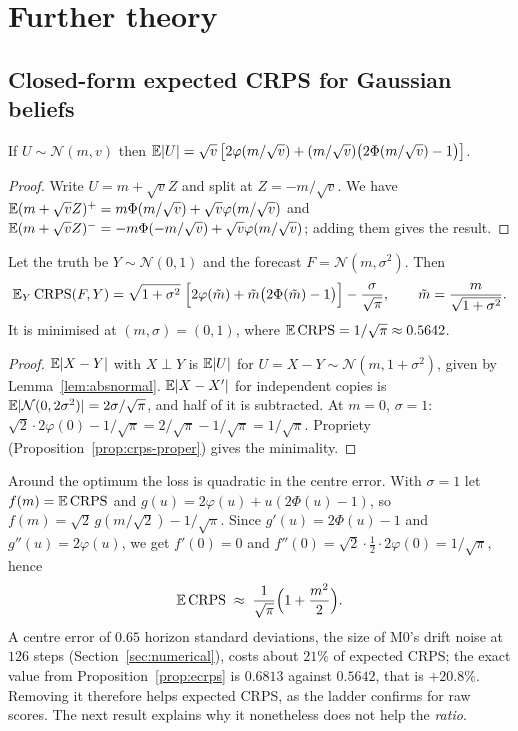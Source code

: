 \section{Further theory}\label{app:theory}

\subsection{Closed-form expected CRPS for Gaussian beliefs}

\begin{lemma}\label{lem:absnormal}
If $U\sim\mathcal N(m,v)$ then $\mathbb{E}|U|=\sqrt v\,\bigl[2\varphi(m/\sqrt v)+(m/\sqrt v)\bigl(2\Phi(m/\sqrt v)-1\bigr)\bigr]$.
\end{lemma}
\begin{proof}
Write $U=m+\sqrt vZ$ and split at $Z=-m/\sqrt v$. We have $\mathbb{E}(m+\sqrt vZ)^+=m\Phi(m/\sqrt v)+\sqrt v\varphi(m/\sqrt v)$ and
$\mathbb{E}(m+\sqrt vZ)^-=-m\Phi(-m/\sqrt v)+\sqrt v\varphi(m/\sqrt v)$; adding them gives the result.
\end{proof}

\begin{proposition}\label{prop:ecrps}
Let the truth be $Y\sim\mathcal N(0,1)$ and the forecast $F=\mathcal N(m,\sigma^2)$. Then
\begin{equation}
  \mathbb{E}_Y\operatorname{CRPS}(F,Y)=\sqrt{1+\sigma^2}\;\Bigl[2\varphi(\tilde m)+\tilde m\bigl(2\Phi(\tilde m)-1\bigr)\Bigr]-\frac{\sigma}{\sqrt\pi},
  \qquad \tilde m=\frac{m}{\sqrt{1+\sigma^2}} .
\end{equation}
It is minimised at $(m,\sigma)=(0,1)$, where $\mathbb{E}\operatorname{CRPS}=1/\sqrt\pi\approx0.5642$.
\end{proposition}
\begin{proof}
$\mathbb{E}|X-Y|$ with $X\perp Y$ is $\mathbb{E}|U|$ for $U=X-Y\sim\mathcal N(m,1+\sigma^2)$, given by Lemma~\ref{lem:absnormal}. $\mathbb{E}|X-X'|$ for independent copies is
$\mathbb{E}|\mathcal N(0,2\sigma^2)|=2\sigma/\sqrt\pi$, and half of it is subtracted. At $m=0$, $\sigma=1$: $\sqrt2\cdot2\varphi(0)-1/\sqrt\pi=2/\sqrt\pi-1/\sqrt\pi=1/\sqrt\pi$.
Propriety (Proposition~\ref{prop:crps-proper}) gives the minimality.
\end{proof}
Around the optimum the loss is quadratic in the centre error. With $\sigma=1$ let $f(m)=\mathbb{E}\operatorname{CRPS}$ and $g(u)=2\varphi(u)+u(2\Phi(u)-1)$, so
$f(m)=\sqrt2\,g(m/\sqrt2)-1/\sqrt\pi$. Since $g'(u)=2\Phi(u)-1$ and $g''(u)=2\varphi(u)$, we get $f'(0)=0$ and $f''(0)=\sqrt2\cdot\frac12\cdot2\varphi(0)=1/\sqrt\pi$, hence
\begin{equation}
  \mathbb{E}\operatorname{CRPS}\;\approx\;\frac{1}{\sqrt\pi}\Bigl(1+\frac{m^2}{2}\Bigr).
\end{equation}
A centre error of $0.65$ horizon standard deviations, the size of M0's drift noise at $126$ steps (Section~\ref{sec:numerical}), costs about $21\%$ of
expected CRPS; the exact value from Proposition~\ref{prop:ecrps} is $0.6813$ against $0.5642$, that is $+20.8\%$. Removing it therefore helps expected CRPS, as the ladder confirms
for raw scores. The next result explains why it nonetheless does not help the \emph{ratio}.

